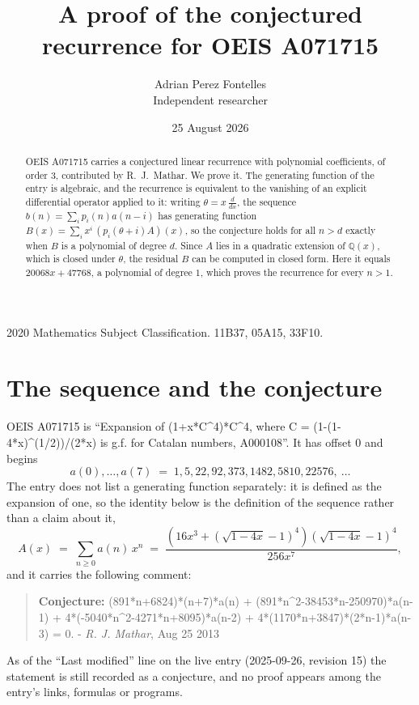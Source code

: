 \documentclass[11pt,a4paper]{article}
\title{A proof of the conjectured recurrence for OEIS A071715}
\author{Adrian Perez Fontelles\\ \small Independent researcher}
\date{25 August 2026}
\theoremstyle{plain}
\theoremstyle{definition}
\begin{document}
\maketitle

\begin{abstract}
OEIS A071715 carries a conjectured linear recurrence with polynomial coefficients, of
order 3, contributed by R.~J.~Mathar. We prove it. The generating function of the
entry is algebraic, and the recurrence is equivalent to the vanishing of an explicit
differential operator applied to it: writing $\theta=x\,\frac{d}{dx}$, the sequence
$b(n)=\sum_{i}p_{i}(n)a(n-i)$ has generating function
$B(x)=\sum_{i}x^{i}\,(p_{i}(\theta+i)A)(x)$, so the conjecture holds for all $n>d$ exactly
when $B$ is a polynomial of degree $d$. Since $A$ lies in a quadratic extension of
$\mathbb{Q}(x)$, which is closed under $\theta$, the residual $B$ can be computed in
closed form. Here it equals $20068 x + 47768$, a polynomial of degree $1$, which proves
the recurrence for every $n>1$.
\end{abstract}

\noindent\small 2020 Mathematics Subject Classification. 11B37, 05A15, 33F10.\normalsize

\section{The sequence and the conjecture}

OEIS A071715 is ``Expansion of (1+x*C\^{}4)*C\^{}4, where C = (1-(1-4*x)\^{}(1/2))/(2*x) is g.f. for Catalan numbers, A000108''. It has offset $0$ and begins
\[
a(0),\dots,a(7)\;=\;1, 5, 22, 92, 373, 1482, 5810, 22576,\ \dots
\]
The entry does not list a generating function separately: it is defined as the
expansion of one, so the identity below is the definition of the sequence rather than a
claim about it,
\begin{equation}\label{eq:gf}
A(x)\;=\;\sum_{n\ge 0} a(n)\,x^{n}\;=\;\frac{\left(16 x^{3} + \left(\sqrt{1 - 4 x} - 1\right)^{4}\right) \left(\sqrt{1 - 4 x} - 1\right)^{4}}{256 x^{7}} ,
\end{equation}
and it carries the following comment:
\begin{quote}\small
\textbf{Conjecture:} (891*n+6824)*(n+7)*a(n) + (891*n\^{}2-38453*n-250970)*a(n-1) + 4*(-5040*n\^{}2-4271*n+8095)*a(n-2) + 4*(1170*n+3847)*(2*n-1)*a(n-3) = 0. - \emph{R. J. Mathar}, Aug 25 2013
\end{quote}
As of the ``Last modified'' line on the live entry (2025-09-26, revision 15) the
statement is still recorded as a conjecture, and no proof appears among the entry's links,
formulas or programs.
\end{document}
